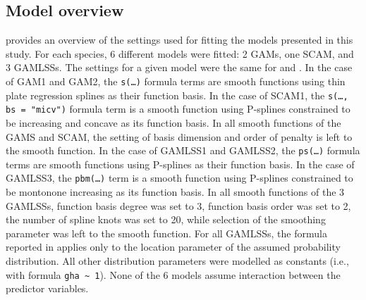 \subsection{Model overview}

 provides an overview of the settings used for fitting the models presented in this study.  For each species, 6 different models were fitted: 2 GAMs, one SCAM, and 3 GAMLSSs.  The settings for a given model were the same for \Beech{} and \Spruce{}.  In the case of GAM1 and GAM2, the \texttt{s(\textnormal{\ldots})} formula terms are smooth functions using thin plate regression splines as their function basis.  In the case of SCAM1, the \texttt{s(\textnormal{\ldots}, bs = "micv")} formula term is a smooth function using P-splines constrained to be increasing and concave as its function basis.  In all smooth functions of the GAMS and SCAM, the setting of basis dimension and order of penalty is left to the smooth function.  In the case of GAMLSS1 and GAMLSS2, the \texttt{ps(\textnormal{\ldots})} formula terms are smooth functions using P-splines as their function basis.  In the case of GAMLSS3, the \texttt{pbm(\ldots{})} term is a smooth function using P-splines constrained to be montonone increasing as its function basis.  In all smooth functions of the 3 GAMLSSs, function basis degree was set to 3, function basis order was set to 2, the number of spline knots was set to 20, while selection of the smoothing parameter was left to the smooth function. For all GAMLSSs, the formula reported in  applies only to the location parameter of the assumed probability distribution. All other distribution parameters were modelled as constants (i.e., with formula \texttt{gha \textasciitilde{} 1}).  None of the 6 models assume interaction between the predictor variables.

